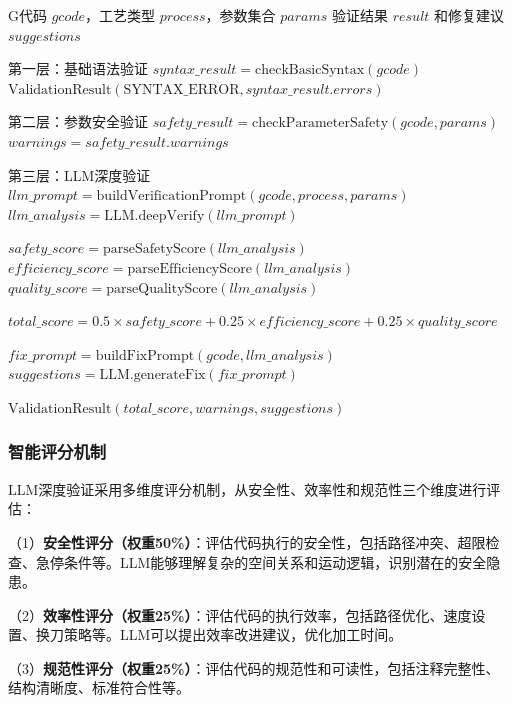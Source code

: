 \documentclass[preprint,12pt]{elsarticle}
\begin{document}
\begin{algorithm}[htbp]
\caption{三层递进式G代码验证算法}
\label{alg:gcode-verification}
\begin{algorithmic}[1]
\Require G代码 $gcode$，工艺类型 $process$，参数集合 $params$
\Ensure 验证结果 $result$ 和修复建议 $suggestions$

\Statex 第一层：基础语法验证
\State $syntax\_result = \text{checkBasicSyntax}(gcode)$
    \Return $\text{ValidationResult}(\text{SYNTAX\_ERROR}, syntax\_result.errors)$
\EndIf

\Statex 第二层：参数安全验证
\State $safety\_result = \text{checkParameterSafety}(gcode, params)$
    \State $warnings = safety\_result.warnings$
\EndIf

\Statex 第三层：LLM深度验证
\State $llm\_prompt = \text{buildVerificationPrompt}(gcode, process, params)$
\State $llm\_analysis = \text{LLM.deepVerify}(llm\_prompt)$

\State $safety\_score = \text{parseSafetyScore}(llm\_analysis)$
\State $efficiency\_score = \text{parseEfficiencyScore}(llm\_analysis)$
\State $quality\_score = \text{parseQualityScore}(llm\_analysis)$

\State $total\_score = 0.5 \times safety\_score + 0.25 \times efficiency\_score + 0.25 \times quality\_score$

    \State $fix\_prompt = \text{buildFixPrompt}(gcode, llm\_analysis)$
    \State $suggestions = \text{LLM.generateFix}(fix\_prompt)$
\EndIf

\Return $\text{ValidationResult}(total\_score, warnings, suggestions)$
\end{algorithmic}
\end{algorithm}

\subsubsection{智能评分机制}

LLM深度验证采用多维度评分机制，从安全性、效率性和规范性三个维度进行评估：

（1）\textbf{安全性评分（权重50\%）}：评估代码执行的安全性，包括路径冲突、超限检查、急停条件等。LLM能够理解复杂的空间关系和运动逻辑，识别潜在的安全隐患。

（2）\textbf{效率性评分（权重25\%）}：评估代码的执行效率，包括路径优化、速度设置、换刀策略等。LLM可以提出效率改进建议，优化加工时间。

（3）\textbf{规范性评分（权重25\%）}：评估代码的规范性和可读性，包括注释完整性、结构清晰度、标准符合性等。
\end{document}
